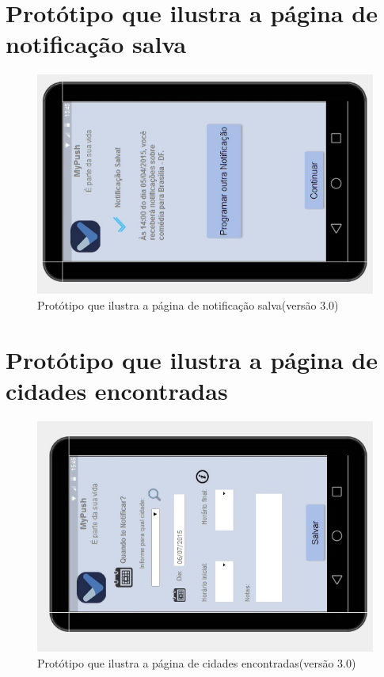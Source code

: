 \begin{apendicesenv}
    \pagebreak
      \section*{Protótipo que ilustra a página de notificação salva}

    \begin{figure}[!htbp]
      \centering
      \includegraphics[scale=0.9, angle=-90]{editaveis/figuras/prototipo_alta_fidelidade_v3/3_5}
      \caption{Protótipo que ilustra a página de notificação salva(versão 3.0)}
      \label{v3}
    \end{figure}
    
    \pagebreak
      \section*{Protótipo que ilustra a página de cidades encontradas}

    \begin{figure}[!htbp]
      \centering
      \includegraphics[scale=0.9, angle=-90]{editaveis/figuras/prototipo_alta_fidelidade_v3/3_6}
      \caption{Protótipo que ilustra a página de cidades encontradas(versão 3.0)}
      \label{v3}
    \end{figure}
    

\end{apendicesenv}
